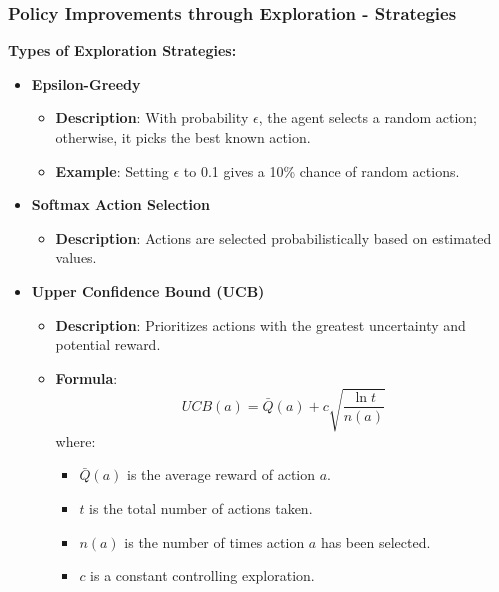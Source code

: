 \documentclass{beamer}
\begin{document}
\begin{frame}[fragile]
    \frametitle{Policy Improvements through Exploration - Strategies}
    \textbf{Types of Exploration Strategies:}
    \begin{itemize}
        \item \textbf{Epsilon-Greedy}
            \begin{itemize}
                \item \textbf{Description}: With probability $\epsilon$, the agent selects a random action; otherwise, it picks the best known action.
                \item \textbf{Example}: Setting $\epsilon$ to 0.1 gives a 10\% chance of random actions.
            \end{itemize}
        \item \textbf{Softmax Action Selection}
            \begin{itemize}
                \item \textbf{Description}: Actions are selected probabilistically based on estimated values.
            \end{itemize}
        \item \textbf{Upper Confidence Bound (UCB)}
            \begin{itemize}
                \item \textbf{Description}: Prioritizes actions with the greatest uncertainty and potential reward.
                \item \textbf{Formula}:
                \begin{equation}
                    UCB(a) = \bar{Q}(a) + c \sqrt{\frac{\ln t}{n(a)}}
                \end{equation}
                where:
                \begin{itemize}
                    \item $\bar{Q}(a)$ is the average reward of action $a$.
                    \item $t$ is the total number of actions taken.
                    \item $n(a)$ is the number of times action $a$ has been selected.
                    \item $c$ is a constant controlling exploration.
                \end{itemize}
            \end{itemize}
    \end{itemize}
\end{frame}
\end{document}
